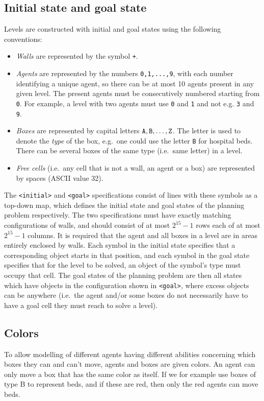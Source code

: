 \documentclass[12pt,a4paper]{article}
\begin{document}
\subsection{Initial state and goal state}
Levels are constructed with initial and goal states using the following conventions:
\begin{itemize}
    \item \emph{Walls} are represented by the symbol \verb|+|.
    \item \emph{Agents} are represented by the numbers \verb|0,1,...,9|, with each number identifying a unique agent, so there can be at most 10 agents present in any given level. The present agents must be consecutively numbered starting from \verb|0|. For example, a level with two agents must use \verb|0| and \verb|1| and not e.g. \verb|3| and \verb|9|.
    \item \emph{Boxes} are represented by capital letters $\verb|A|, \verb|B|, \dots, \verb|Z|$. The letter is used to denote the \emph{type} of the box, e.g.\ one could use the letter \verb|B| for hospital beds. There can be several boxes of the same type (i.e.\ same letter) in a level.
     \item \emph{Free cells} (i.e.\ any cell that is not a wall, an agent or a box) are represented by spaces (ASCII value 32).
\end{itemize}
The \texttt{<initial>} and \texttt{<goal>} specifications consist of lines with these symbols as a top-down map, which defines the initial state and goal states of the planning problem respectively. The two specifications must have exactly matching configurations of walls, and should consist of at most $2^{15} - 1$ rows each of at most $2^{15} - 1$ columns. It is required that the agent and all boxes in a level are in areas entirely enclosed by walls. Each symbol in the initial state specifies that a corresponding object starts in that position, and each symbol in the goal state specifies that for the level to be solved, an object of the symbol's type must occupy that cell. The goal states of the planning problem are then all states which have objects in the configuration shown in \texttt{<goal>}, where excess objects can be anywhere (i.e.\ the agent and/or some boxes do not necessarily have to have a goal cell they must reach to solve a level).

\subsection{Colors}
To allow modelling of different agents having different abilities concerning which boxes they can and can't move, agents and boxes are given colors. An agent can only move a box that has the same color as itself. If we for example use boxes of type B to represent beds, and if these are red, then only the red agents can move beds.
\end{document}
